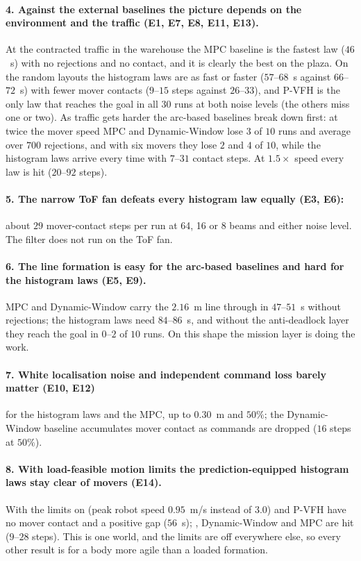 \paragraph{4. Against the external baselines the picture depends on the
environment and the traffic (E1, E7, E8, E11, E13).} At the contracted
traffic in the warehouse the MPC baseline is the fastest law ($46$~s)
with no rejections and no contact, and it is clearly the best on the
plaza. On the random layouts the histogram laws are as fast or faster
($57$--$68$~s against $66$--$72$~s) with fewer mover contacts ($9$--$15$
steps against $26$--$33$), and P-VFH is the only law that reaches the
goal in all $30$ runs at both noise levels (the others miss one or two).
As traffic gets harder the arc-based baselines break down first: at twice
the mover speed MPC and Dynamic-Window lose $3$ of $10$ runs and average
over $700$ rejections, and with six movers they lose $2$ and $4$ of $10$,
while the histogram laws arrive every time with $7$--$31$ contact steps.
At $1.5\times$ speed every law is hit ($20$--$92$ steps).

\paragraph{5. The narrow ToF fan defeats every histogram law equally (E3,
E6):} about $29$ mover-contact steps per run at 64, 16 or 8 beams and
either noise level. The filter does not run on the ToF fan.

\paragraph{6. The line formation is easy for the arc-based baselines and
hard for the histogram laws (E5, E9).} MPC and Dynamic-Window carry the
$2.16$~m line through in $47$--$51$~s without rejections; the histogram
laws need $84$--$86$~s, and without the anti-deadlock layer they reach
the goal in $0$--$2$ of $10$ runs. On this shape the mission layer is
doing the work.

\paragraph{7. White localisation noise and independent command loss
barely matter (E10, E12)} for the histogram laws and the MPC, up to
$0.30$~m and $50\%$; the Dynamic-Window baseline accumulates mover
contact as commands are dropped ($16$ steps at $50\%$).

\paragraph{8. With load-feasible motion limits the prediction-equipped
histogram laws stay clear of movers (E14).} With the limits on (peak
robot speed $0.95$~m/s instead of $3.0$)  and P-VFH have no
mover contact and a positive gap ($56$~s); , Dynamic-Window and
MPC are hit ($9$--$28$ steps). This is one world, and the limits are off
everywhere else, so every other result is for a body more agile than a
loaded formation.

